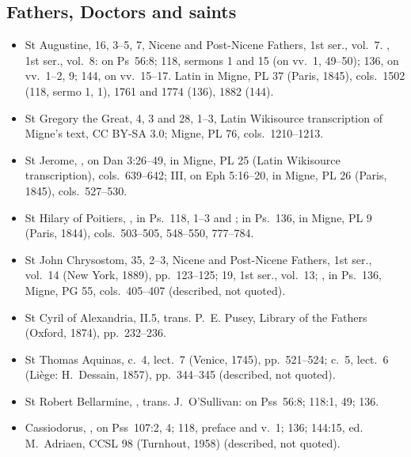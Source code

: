 {\subsection*{Fathers, Doctors and saints}
\begin{itemize}\setlength{\itemsep}{0.15em}\setlength{\parskip}{0pt}
\item St Augustine,  16, 3--5, 7, Nicene and Post-Nicene Fathers, 1st ser., vol.~7. , 1st ser., vol.~8: on Ps~56:8; 118, sermons 1 and 15 (on vv.~1, 49--50); 136, on vv.~1--2, 9; 144, on vv.~15--17. Latin in Migne, PL 37 (Paris, 1845), cols.~1502 (118, sermo 1, 1), 1761 and 1774 (136), 1882 (144).
\item St Gregory the Great,  4, 3 and 28, 1--3, Latin Wikisource transcription of Migne's text, CC BY-SA 3.0; Migne, PL 76, cols.~1210--1213.
\item St Jerome, , on Dan 3:26--49, in Migne, PL 25 (Latin Wikisource transcription), cols.~639--642;  III, on Eph 5:16--20, in Migne, PL 26 (Paris, 1845), cols.~527--530.
\item St Hilary of Poitiers, , in Ps.~118,  1--3 and ; in Ps.~136, in Migne, PL 9 (Paris, 1844), cols.~503--505, 548--550, 777--784.
\item St John Chrysostom,  35, 2--3, Nicene and Post-Nicene Fathers, 1st ser., vol.~14 (New York, 1889), pp.~123--125;  19, 1st ser., vol.~13; , in Ps.~136, Migne, PG 55, cols.~405--407 (described, not quoted).
\item St Cyril of Alexandria,  II.5, trans. P.~E. Pusey, Library of the Fathers (Oxford, 1874), pp.~232--236.
\item St Thomas Aquinas,  c.~4, lect.~7 (Venice, 1745), pp.~521--524;  c.~5, lect.~6 (Liège: H.~Dessain, 1857), pp.~344--345 (described, not quoted).
\item St Robert Bellarmine, , trans. J.~O'Sullivan: on Pss~56:8; 118:1, 49; 136.
\item Cassiodorus, , on Pss~107:2, 4; 118, preface and v.~1; 136; 144:15, ed. M.~Adriaen, CCSL 98 (Turnhout, 1958) (described, not quoted).
\end{itemize}

}
